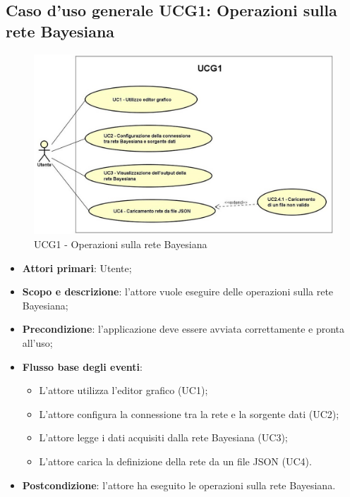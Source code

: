 \newpage
\subsection{Caso d'uso generale UCG1: Operazioni sulla rete Bayesiana}
\begin{figure} [H]
	\centering
	\includegraphics[scale=0.7]{Img/UCG1}
	\caption{UCG1 - Operazioni sulla rete Bayesiana}\label{}
\end{figure}
\begin{itemize}
	\item{\textbf{Attori primari}: Utente;}
	\item{\textbf{Scopo e descrizione}: l'attore vuole eseguire delle operazioni sulla rete Bayesiana;}
	\item{\textbf{Precondizione}: l'applicazione deve essere avviata correttamente e pronta all'uso;}
	\item{\textbf{Flusso base degli eventi}:
		\begin{itemize}
			\item{L'attore utilizza l'editor grafico (UC1);}
			\item{L'attore configura la connessione tra la rete e la sorgente dati (UC2);}
			\item{L'attore legge i dati acquisiti dalla rete Bayesiana (UC3)};
			\item{L'attore carica la definizione della rete da un file JSON (UC4).}
		\end{itemize}
	}
	\item{\textbf{Postcondizione}: l'attore ha eseguito le operazioni sulla rete Bayesiana.}
\end{itemize}

